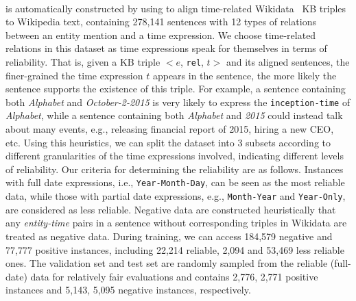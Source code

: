 \paragraph{\TimeRE}
is automatically constructed by using \DS to align time-related Wikidata~\cite{vrandevcic2014wikidata} KB triples to
Wikipedia text, containing 278,141 sentences with 12
types of relations  between an entity mention and a time expression.
We choose time-related relations in this dataset as time expressions speak for themselves in
terms of reliability. That is, given a KB triple $<$$e$, \texttt{rel}, $t$$>$ and its
aligned sentences,  the  finer-grained the time expression $t$ appears in the sentence,
the more likely the sentence  supports the existence of this triple.
For example, a sentence containing both \emph{Alphabet} and \emph{October-2-2015} is very likely to express the \texttt{inception-time} of \emph{Alphabet}, while a sentence containing both \emph{Alphabet} and \emph{2015} could instead talk  about many events, e.g.,  releasing financial report of 2015, hiring a new CEO, etc.
Using this heuristics, we can split the dataset into
3 subsets according to different granularities of the time expressions involved, indicating different levels of reliability.
Our criteria for determining the reliability are as follows.
Instances with full date expressions, i.e., \texttt{Year-Month-Day}, can be seen as the most reliable data, while those with
partial date expressions, e.g., \texttt{Month-Year} and \texttt{Year-Only}, are considered as less
reliable.  Negative data are constructed  heuristically that any
\emph{entity-time} pairs in a sentence without corresponding triples in Wikidata are treated as negative data.
During training, we can access  184,579 negative
 and  77,777 positive instances, including 22,214 reliable,
2,094 and 53,469 less reliable ones. The validation set and test set are randomly sampled from
the reliable (full-date) data for relatively fair evaluations and contains
2,776, 2,771 positive instances and 5,143, 5,095 negative instances, respectively.



